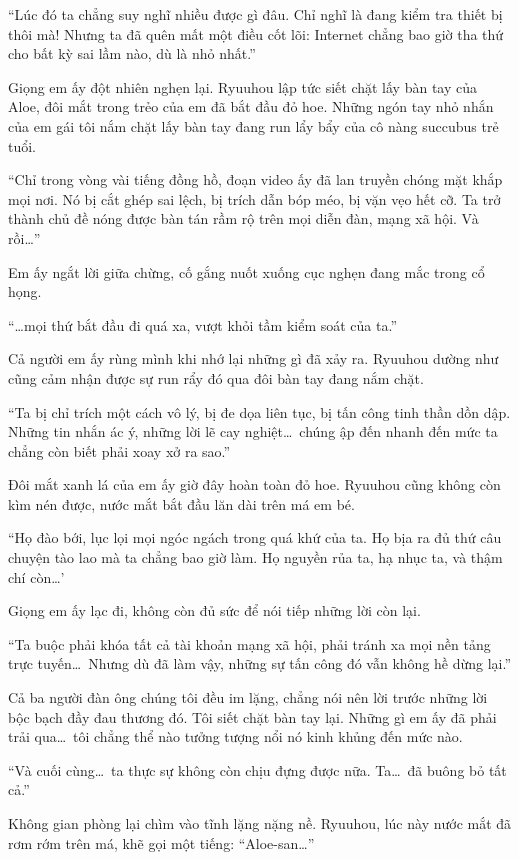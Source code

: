 \documentclass[../main.tex]{subfiles}
\begin{document}
``Lúc đó ta chẳng suy nghĩ nhiều được gì đâu. Chỉ nghĩ là đang kiểm tra thiết bị thôi mà! Nhưng ta đã quên mất một điều cốt lõi: Internet chẳng bao giờ tha thứ cho bất kỳ sai lầm nào, dù là nhỏ nhất.''

Giọng em ấy đột nhiên nghẹn lại. Ryuuhou lập tức siết chặt lấy bàn tay của Aloe, đôi mắt trong trẻo của em đã bắt đầu đỏ hoe. Những ngón tay nhỏ nhắn của em gái tôi nắm chặt lấy bàn tay đang run lẩy bẩy của cô nàng succubus trẻ tuổi.

``Chỉ trong vòng vài tiếng đồng hồ, đoạn video ấy đã lan truyền chóng mặt khắp mọi nơi. Nó bị cắt ghép sai lệch, bị trích dẫn bóp méo, bị vặn vẹo hết cỡ. Ta trở thành chủ đề nóng được bàn tán rầm rộ trên mọi diễn đàn, mạng xã hội. Và rồi\dots''

Em ấy ngắt lời giữa chừng, cố gắng nuốt xuống cục nghẹn đang mắc trong cổ họng.

``\dots mọi thứ bắt đầu đi quá xa, vượt khỏi tầm kiểm soát của ta.''

Cả người em ấy rùng mình khi nhớ lại những gì đã xảy ra. Ryuuhou dường như cũng cảm nhận được sự run rẩy đó qua đôi bàn tay đang nắm chặt.

``Ta bị chỉ trích một cách vô lý, bị đe dọa liên tục, bị tấn công tinh thần dồn dập. Những tin nhắn ác ý, những lời lẽ cay nghiệt\dots\ chúng ập đến nhanh đến mức ta chẳng còn biết phải xoay xở ra sao.''

Đôi mắt xanh lá của em ấy giờ đây hoàn toàn đỏ hoe. Ryuuhou cũng không còn kìm nén được, nước mắt bắt đầu lăn dài trên má em bé.

``Họ đào bới, lục lọi mọi ngóc ngách trong quá khứ của ta. Họ bịa ra đủ thứ câu chuyện tào lao mà ta chẳng bao giờ làm. Họ nguyền rủa ta, hạ nhục ta, và thậm chí còn\dots'

Giọng em ấy lạc đi, không còn đủ sức để nói tiếp những lời còn lại.

``Ta buộc phải khóa tất cả tài khoản mạng xã hội, phải tránh xa mọi nền tảng trực tuyến\dots\ Nhưng dù đã làm vậy, những sự tấn công đó vẫn không hề dừng lại.''

Cả ba người đàn ông chúng tôi đều im lặng, chẳng nói nên lời trước những lời bộc bạch đầy đau thương đó. Tôi siết chặt bàn tay lại. Những gì em ấy đã phải trải qua\dots\ tôi chẳng thể nào tưởng tượng nổi nó kinh khủng đến mức nào.

``Và cuối cùng\dots\ ta thực sự không còn chịu đựng được nữa. Ta\dots\ đã buông bỏ tất cả.''

Không gian phòng lại chìm vào tĩnh lặng nặng nề. Ryuuhou, lúc này nước mắt đã rơm rớm trên má, khẽ gọi một tiếng: ``Aloe-san\dots''
\end{document}
